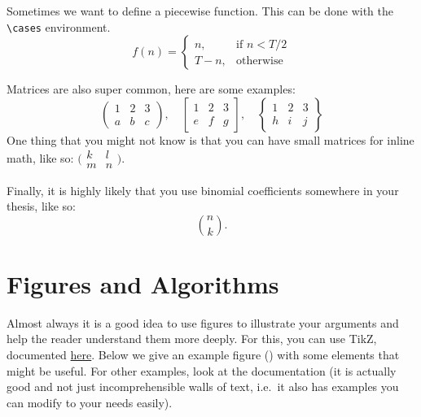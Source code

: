 \begin{Rule}[Cases] Sometimes we want to define a piecewise function. This can be done with the \lstinline|\cases| environment.
\[
f(n) = \begin{cases}
            n, & \text{if $n < T/2$}\\
            T - n, & \text{otherwise}
 \end{cases}\]
\end{Rule}
\begin{Rule}[Matrices] Matrices are also super common, here are some examples:
\[\begin{pmatrix}
    1 & 2 & 3\\
    a & b & c
    \end{pmatrix}, \quad 
    \begin{bmatrix}
    1 & 2 & 3\\
    e & f & g
    \end{bmatrix}, \quad
    \begin{Bmatrix}
    1 & 2 & 3\\
    h & i & j
    \end{Bmatrix}\]
One thing that you might not know is that you can have small matrices for inline math, like so: $\big(\begin{smallmatrix}
  k & l\\
  m & n
\end{smallmatrix}\big)$.
\end{Rule}
\begin{Rule}[Binomials] Finally, it is highly likely that you use binomial coefficients somewhere in your thesis, like so:
\[\binom{n}{k}.\]
\end{Rule}
\section{Figures and Algorithms}
Almost always it is a good idea to use figures to illustrate your arguments and help the 
reader understand them more deeply. For this, you can use TikZ, documented \href{https://tikz.dev/}{here}. Below we give 
an example figure () with some elements that might be useful. For other examples, look at the documentation (it is actually good 
and not just incomprehensible walls of text, i.e.\ it also has examples you can modify to your needs easily).


